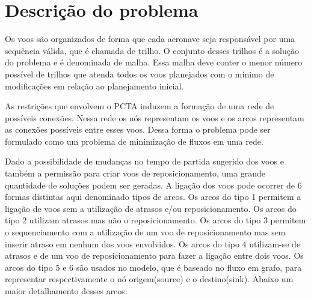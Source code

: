\chapter{Descrição do problema}\label{cap:descprob}

  Os voos são organizados de forma que cada aeronave seja responsável por uma sequência válida, que é chamada de trilho.  O conjunto desses trilhos é a solução do problema e é denominada de malha. Essa malha deve conter o menor número possível de trilhos que atenda todos os voos planejados com o mínimo de modificações em relação ao planejamento inicial.
  
  As restrições que envolvem o PCTA induzem a formação de uma rede de possíveis conexões. Nessa rede os nós representam os voos e os arcos representam as conexões possíveis entre esses voos. Dessa forma o problema pode ser formulado como um problema de minimização de fluxos em uma rede.
  
  Dado a possibilidade de mudanças no tempo de partida sugerido dos voos e também a permissão para criar voos de reposicionamento, uma grande quantidade de soluções podem ser geradas. A ligação dos voos pode ocorrer de 6 formas distintas aqui denominado tipos de arcos. Os  arcos do tipo 1 permitem a ligação de voos sem a utilização de atrasos e/ou reposicionamento. Os arcos do tipo 2 utilizam atrasos mas não o reposicionamento. Os arcos do tipo 3 permitem o sequenciamento com a utilização de um voo de reposicionamento mas sem inserir atraso em nenhum dos voos envolvidos. Os arcos do tipo 4 utilizam-se de atrasos e de um voo de reposicionamento para fazer a ligação entre dois voos. Os arcos do tipo 5 e 6 são usados no modelo, que é baseado no fluxo em grafo, para representar respectivamente o nó origem(source) e o destino(sink). Abaixo um maior detalhamento desses arcos:


